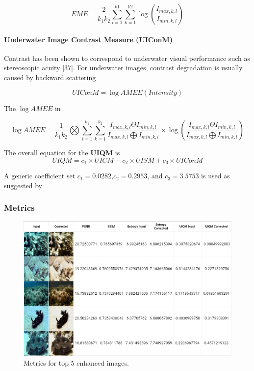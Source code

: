 \documentclass[a4paper]{article}
\begin{document}
\begin{equation}
    \label{eq:uism-eme}
    EME = \frac{2}{k_1 k_2}\sum_{l=1}^{k1}\sum_{k=1}^{k2}\log(\frac{I_{max, k, l}}{I_{min, k, l}})
\end{equation}

\paragraph{Underwater Image Contrast Measure (UIConM)}
Contrast has been shown to correspond to underwater visual performance such as stereoscopic acuity [37]. For underwater images, contrast degradation is usually caused by backward scattering

\begin{equation}
    \label{eq:uiconm}
    UIConM = \log{AMEE(Intensity)}
\end{equation}

The $\log{AMEE}$ in

\begin{equation}
    \label{eq:uiconm-logamee}
    \log{AMEE} = \frac{1}{k_1 k_2} \bigotimes \sum_{l=1}^{k_1}\sum_{k=1}^{k_2}\frac{I_{max,k,l} \Theta I_{min,k,l}}{I_{max,k,l} \bigoplus I_{min,k,l}} \times \log(\frac{I_{max,k,l} \Theta I_{min,k,l}}{I_{max,k,l} \bigoplus I_{min,k,l}})
\end{equation}

The overall equation for the \textbf{UIQM} is
\begin{equation}
    \label{eq:uiqm}
    UIQM = c_1 \times UICM + c_2 \times UISM + c_3 \times UIConM
\end{equation}

A generic coefficient set $c_1 = 0.0282$,$c_2 = 0.2953$, and $c_3 = 3.5753$ is used as suggested by \cite{7305804}

\subsubsection{Metrics}

\begin{figure}[H]
  \centering
  \includegraphics[width=1\textwidth]{quantitative-1.png}
  \caption{Metrics for top 5 enhanced images.}
  \label{fig:quantitativeanalysis}
\end{figure}
\end{document}
